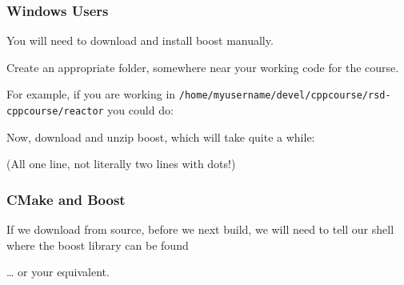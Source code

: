 \subsubsection{Windows Users}\label{windows-users}

You will need to download and install boost manually.

Create an appropriate folder, somewhere near your working code for the
course.

For example, if you are working in
\texttt{/home/myusername/devel/cppcourse/rsd-cppcourse/reactor} you
could do:

\begin{Shaded}
\begin{Highlighting}[]
 
 
\end{Highlighting}
\end{Shaded}

Now, download and unzip boost, which will take quite a while:

\begin{Shaded}
\begin{Highlighting}[]
 
         \KeywordTok{>} 
 
\end{Highlighting}
\end{Shaded}

(All one line, not literally two lines with dots!)

\subsubsection{CMake and Boost}\label{cmake-and-boost}

If we download from source, before we next build, we will need to tell
our shell where the boost library can be found

\begin{Shaded}
\begin{Highlighting}[]
 
 
 
\end{Highlighting}
\end{Shaded}

\ldots{} or your equivalent.

